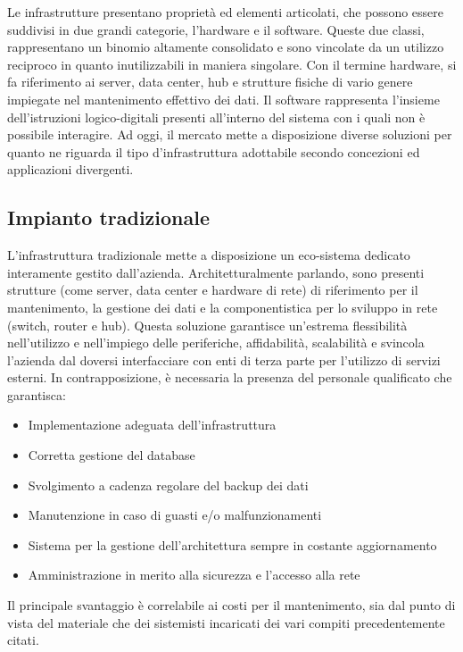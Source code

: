 Le infrastrutture presentano proprietà ed elementi articolati, che possono essere suddivisi in due grandi categorie, l'hardware e il software.
Queste due classi, rappresentano un binomio altamente consolidato e sono vincolate da un utilizzo reciproco in quanto inutilizzabili in maniera singolare.
Con il termine hardware, si fa riferimento ai server, data center, hub e strutture fisiche di vario genere impiegate nel mantenimento effettivo dei dati.
Il software rappresenta l'insieme dell'istruzioni logico-digitali presenti all'interno del sistema con i quali non è possibile interagire.
Ad oggi, il mercato mette a disposizione diverse soluzioni per quanto ne riguarda il tipo d'infrastruttura adottabile secondo concezioni ed applicazioni divergenti.

\subsection{Impianto tradizionale}
L'infrastruttura tradizionale mette a disposizione un eco-sistema dedicato interamente gestito dall'azienda. Architetturalmente parlando, sono presenti strutture (come server, data center e hardware di rete) di riferimento per il mantenimento, la gestione dei dati e la componentistica per lo sviluppo in rete (switch, router e hub).
Questa soluzione garantisce un'estrema flessibilità nell'utilizzo e nell'impiego delle periferiche, affidabilità, scalabilità e svincola l'azienda dal doversi interfacciare con enti di terza parte per l'utilizzo di servizi esterni.
In contrapposizione, è necessaria la presenza del personale qualificato che garantisca:
\begin{itemize}
    \item Implementazione adeguata dell'infrastruttura
    \item Corretta gestione del database
    \item Svolgimento a cadenza regolare del backup dei dati
    \item Manutenzione in caso di guasti e/o malfunzionamenti
    \item Sistema per la gestione dell'architettura sempre in costante aggiornamento
    \item Amministrazione in merito alla sicurezza e l'accesso alla rete
\end{itemize}
Il principale svantaggio è correlabile ai costi per il mantenimento, sia dal punto di vista del materiale che dei sistemisti incaricati dei vari compiti precedentemente citati.

